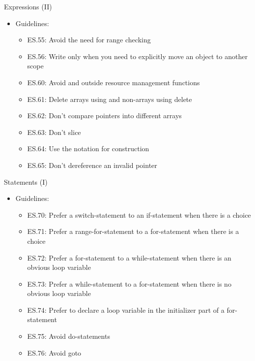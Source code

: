 \begin{frame}[t]{Expressions (II)}
\begin{itemize}
  \item Guidelines:
    \begin{itemize}
      \item ES.55: Avoid the need for range checking
      \item ES.56: Write  only when you need to 
            explicitly move an object to another scope
      \item ES.60: Avoid  and  outside resource 
            management functions
      \item ES.61: Delete arrays using  and non-arrays using delete
      \item ES.62: Don’t compare pointers into different arrays
      \item ES.63: Don’t slice
      \item ES.64: Use the  notation for construction
      \item ES.65: Don’t dereference an invalid pointer
    \end{itemize}
\end{itemize}
\end{frame}

\begin{frame}[t]{Statements (I)}
\begin{itemize}
  \item Guidelines:
    \begin{itemize}
      \item ES.70: Prefer a switch-statement to an if-statement when there is a choice
      \item ES.71: Prefer a range-for-statement to a for-statement when there is a choice
      \item ES.72: Prefer a for-statement to a while-statement when there is an obvious loop variable
      \item ES.73: Prefer a while-statement to a for-statement when there is no obvious loop variable
      \item ES.74: Prefer to declare a loop variable in the initializer part of a for-statement
      \item ES.75: Avoid do-statements
      \item ES.76: Avoid goto
    \end{itemize}
\end{itemize}
\end{frame}

